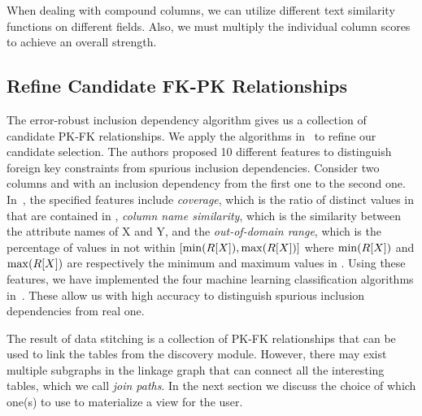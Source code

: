 When dealing with compound columns, we can utilize different text similarity functions on different fields. Also, we must multiply the individual column scores to achieve an overall strength.


\subsection{Refine Candidate FK-PK Relationships}\label{subsec:refine}


The error-robust inclusion dependency algorithm gives us a collection of candidate PK-FK relationships. 
We apply the algorithms in~\cite{DBLP:conf/webdb/RostinABNL09} to refine our candidate selection. The authors proposed 10 different features to distinguish foreign key constraints from spurious inclusion dependencies. Consider two columns \RX and \SY with an inclusion dependency from the first one to the second one. In~\cite{DBLP:conf/webdb/RostinABNL09}, the specified features include \emph{coverage}, which is the ratio of distinct values in \RX that are contained in \SY, \emph{column name similarity}, which is the similarity between the attribute names of X and Y, and the \emph{out-of-domain range}, which is the percentage of values in \SY not within $[\min(R[X]), \max(R[X])]$ where $\min(R[X])$ and $\max(R[X])$ are respectively the minimum and maximum values in \RX. 
Using these features, we have implemented the four machine learning classification algorithms in~\cite{DBLP:conf/webdb/RostinABNL09}. These allow us with high accuracy to distinguish spurious inclusion dependencies from real one.

The result of data stitching is a collection of PK-FK relationships that can be used to link the tables from the discovery module. However, there may exist multiple subgraphs in the linkage graph that can connect all the interesting tables, which we call \emph{join paths}. In the next section we discuss the choice of which one(s) to use to materialize a view for the user.


